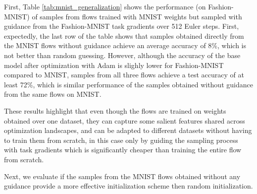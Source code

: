 First, Table \ref{tab:mnist_generalization} shows the performance (on Fashion-MNIST) of samples from flows trained with MNIST weights but sampled with guidance from the Fashion-MNIST task gradients over 512 Euler steps. First, expectedly, the last row of the table shows that samples obtained directly from the MNIST flows without guidance achieve an average accuracy of 8\%, which is not better than random guessing. However, although the accuracy of the base model after optimization with Adam is slighly lower for Fashion-MNIST compared to MNIST, samples from all three flows achieve a test accuracy of at least 72\%, which is similar performance of the samples obtained without guidance from the same flows on MNIST. 

These results highlight that even though the flows are trained on weights obtained over one dataset, they can capture some salient features shared across optimization landscapes, and can be adapted to different datasets without having to train them from scratch, in this case only by guiding the sampling process with task gradients which is significantly cheaper than training the entire flow from scratch.  

Next, we evaluate if the samples from the MNIST flows obtained without any guidance provide a more effective initialization scheme then random initialization. 

